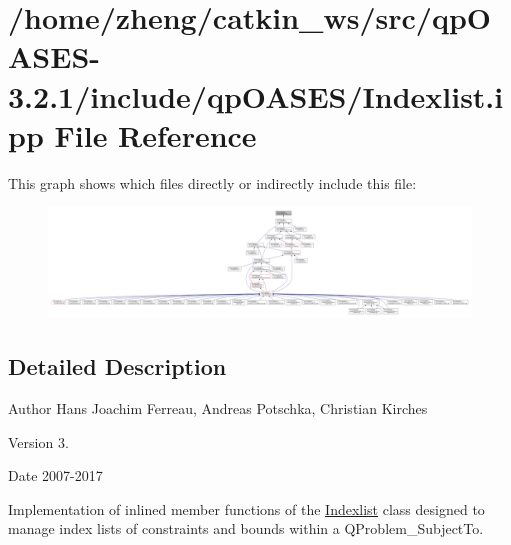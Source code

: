 \hypertarget{_indexlist_8ipp}{}\section{/home/zheng/catkin\+\_\+ws/src/qp\+O\+A\+S\+E\+S-\/3.2.1/include/qp\+O\+A\+S\+E\+S/\+Indexlist.ipp File Reference}
\label{_indexlist_8ipp}
This graph shows which files directly or indirectly include this file\+:
\nopagebreak
\begin{figure}[H]
\begin{center}
\leavevmode
\includegraphics[width=350pt]{_indexlist_8ipp__dep__incl}
\end{center}
\end{figure}


\subsection{Detailed Description}
\begin{DoxyAuthor}{Author}
Hans Joachim Ferreau, Andreas Potschka, Christian Kirches 
\end{DoxyAuthor}
\begin{DoxyVersion}{Version}
3. 
\end{DoxyVersion}
\begin{DoxyDate}{Date}
2007-\/2017
\end{DoxyDate}
Implementation of inlined member functions of the \hyperlink{class_indexlist}{Indexlist} class designed to manage index lists of constraints and bounds within a Q\+Problem\+\_\+\+Subject\+To. 